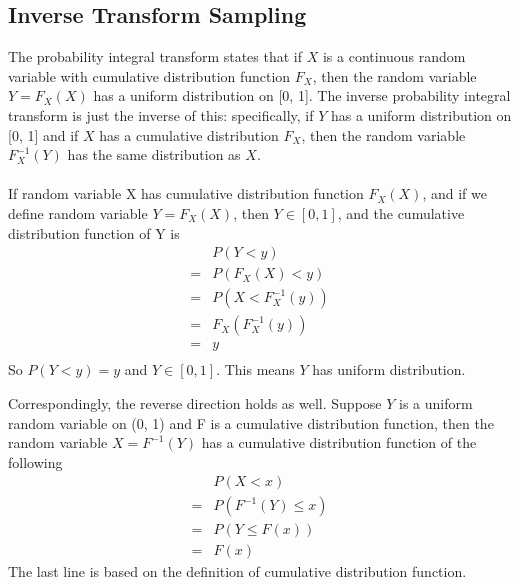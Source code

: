 \documentclass[a4paper]{article}
\begin{document}
\subsection{Inverse Transform Sampling}
The probability integral transform states that if ${\displaystyle X}$ is a continuous random variable with cumulative distribution function ${\displaystyle F_{X}}$, then the random variable ${\displaystyle Y=F_{X}(X)}$ has a uniform distribution on [0, 1]. The inverse probability integral transform is just the inverse of this: specifically, if ${\displaystyle Y}$ has a uniform distribution on [0, 1] and if ${\displaystyle X}$ has a cumulative distribution ${\displaystyle F_{X}}$, then the random variable ${\displaystyle F_{X}^{-1}(Y)}$ has the same distribution as ${\displaystyle X}$.\\

\\
If random variable X has cumulative distribution function $F_X(X)$, and if we define random variable $Y = F_X(X)$,  then $Y \in [0, 1]$, and the cumulative distribution function of Y is
\begin{align*}
	&P(Y<y)\\
	=&P(F_X (X) < y)\\ 
        =&P(X<F_X^{-1}(y))\\
	=&F_X(F_X^{-1}(y)) \\
 	=& y\\
\end{align*}
So $P(Y < y) = y$ and $Y \in [0,1]$. This means $Y$ has uniform distribution.

Correspondingly, the reverse direction holds as well. Suppose $Y$ is a uniform random variable on (0, 1) and F is a cumulative distribution function, then the random variable $X = F^{-1}(Y)$ has a cumulative distribution function of the following
\begin{align*}
	&P(X < x) \\
	=& P(F^{-1}(Y) \leq x ) \\
	=& P(Y \leq F(x)) \\
	=& F(x)
\end{align*}
The last line is based on the definition of cumulative distribution function.
\end{document}
